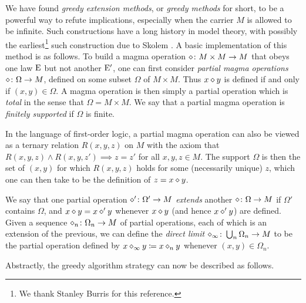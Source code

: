 We have found \emph{greedy extension methods}, or \emph{greedy methods} for short, to be a powerful way to refute implications, especially when the carrier $M$ is allowed to be infinite.  Such constructions have a long history in model theory, with possibly the earliest\footnote{We thank Stanley Burris for this reference.} such construction due to Skolem \cite{skolem}. A basic implementation of this method is as follows.  To build a magma operation $\diamond \colon M \times M \to M$ that obeys one law $\mathrm{E}$ but not another ${\mathrm{E}'}$, one can first consider \emph{partial magma operations} $\diamond \colon \Omega \to M$, defined on some subset $\Omega$ of $M \times M$. Thus $x \diamond y$ is defined if and only if $(x,y) \in \Omega$. A magma operation is then simply a partial operation which is \emph{total} in the sense that $\Omega = M \times M$.  We say that a partial magma operation is \emph{finitely supported} if $\Omega$ is finite.

In the language of first-order logic, a partial magma operation can also be viewed as a ternary relation $R(x,y,z)$ on $M$ with the axiom that $R(x,y,z) \wedge R(x,y,z') \implies z=z'$ for all $x,y,z \in M$.  The support $\Omega$ is then the set of $(x,y)$ for which $R(x,y,z)$ holds for some (necessarily unique) $z$, which one can then take to be the definition of $z = x \diamond y$.

We say that one partial operation $\diamond' \colon \Omega' \to M$ \emph{extends} another $\diamond \colon \Omega \to M$ if $\Omega'$ contains $\Omega$, and $x \diamond y = x \diamond' y$ whenever $x \diamond y$ (and hence $x \diamond' y$) are defined. Given a sequence $\diamond_n \colon \Omega_n \to M$ of partial operations, each of which is an extension of the previous, we can define the \emph{direct limit} $\diamond_\infty \colon \bigcup_n \Omega_n \to M$ to be the partial operation defined by $x \diamond_\infty y \coloneqq x \diamond_n y$ whenever $(x,y) \in \Omega_n$.

Abstractly, the greedy algorithm strategy can now be described as follows.

